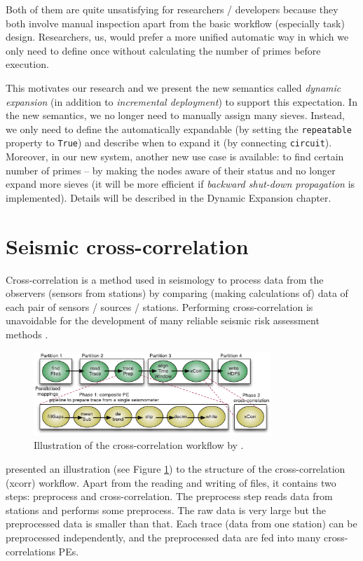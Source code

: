 Both of them are quite unsatisfying for researchers / developers because they both involve manual inspection apart from the basic workflow (especially task) design. Researchers, \eg us, would prefer a more unified automatic way in which we only need to define once without calculating the number of primes before execution.

This motivates our research and we present the new semantics called \emph{dynamic expansion} (in addition to \emph{incremental deployment}) to support this expectation. In the new semantics, we no longer need to manually assign many sieves. Instead, we only need to define the \cdSieve automatically expandable (by setting the \lstinline|repeatable| property to \lstinline|True|) and describe when to expand it (by connecting \lstinline|circuit|). Moreover, in our new system, another new use case is available: to find certain number of primes -- by making the \cdSieve nodes aware of their status and no longer expand more sieves (it will be more efficient if \emph{backward shut-down propagation} is implemented). Details will be described in the Dynamic Expansion chapter.

\section{Seismic cross-correlation}
Cross-correlation is a method used in seismology to process data from the observers (\eg sensors from stations) by comparing (\ie making calculations of) data of each pair of sensors / sources / stations. Performing cross-correlation is unavoidable for the development of many reliable seismic risk assessment methods \cite{doi:10.1177/1094342016649766}.

\begin{figure}[h]
\centering
    \includegraphics[width=0.8\textwidth]{figures/wf_xcorr}
\caption{Illustration of the cross-correlation workflow by \citeauthor{doi:10.1177/1094342016649766}\cite{doi:10.1177/1094342016649766}.}
\label{fig:wf_xcorr}
\end{figure}

\citeauthor{doi:10.1177/1094342016649766}\cite{doi:10.1177/1094342016649766} presented an illustration (see Figure \ref{fig:wf_xcorr}) to the structure of the cross-correlation (xcorr) workflow. Apart from the reading and writing of files, it contains two steps: preprocess and cross-correlation. The preprocess step reads data from stations and performs some preprocess. The raw data is very large but the preprocessed data is smaller than that. Each trace (data from one station) can be preprocessed independently, and the preprocessed data are fed into many cross-correlations PEs.

